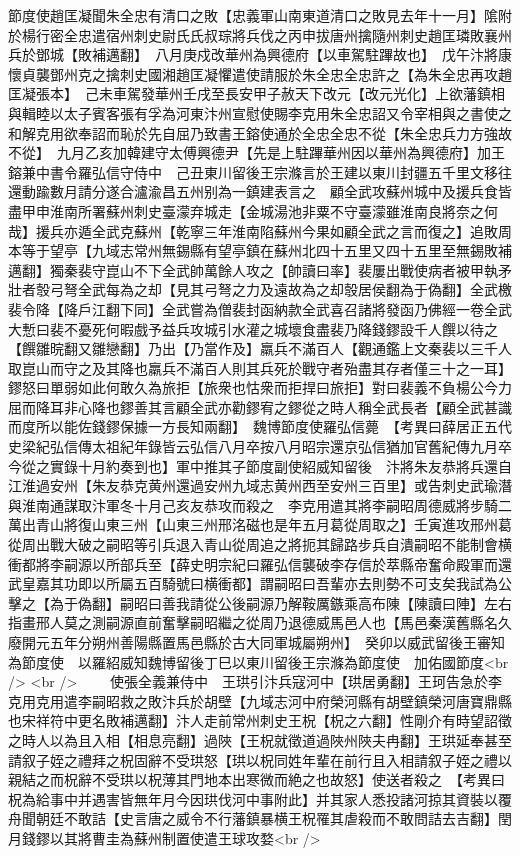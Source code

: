 節度使趙匡凝聞朱全忠有清口之敗【忠義軍山南東道清口之敗見去年十一月】隂附於楊行密全忠遣宿州刺史尉氏氏叔琮將兵伐之丙申拔唐州擒隨州刺史趙匡璘敗襄州兵於鄧城【敗補邁翻】　八月庚戍改華州為興德府【以車駕駐蹕故也】　戊午汴將康懷貞襲鄧州克之擒刺史國湘趙匡凝懼遣使請服於朱全忠全忠許之【為朱全忠再攻趙匡凝張本】　己未車駕發華州壬戌至長安甲子赦天下改元【改元光化】上欲藩鎮相與輯睦以太子賓客張有孚為河東汴州宣慰使賜李克用朱全忠詔又令宰相與之書使之和解克用欲奉詔而恥於先自屈乃致書王鎔使通於全忠全忠不從【朱全忠兵力方強故不從】　九月乙亥加韓建守太傅興德尹【先是上駐蹕華州因以華州為興德府】加王鎔兼中書令羅弘信守侍中　己丑東川留後王宗滌言於王建以東川封疆五千里文移往還動踰數月請分遂合瀘渝昌五州别為一鎮建表言之　顧全武攻蘇州城中及援兵食皆盡甲申淮南所署蘇州刺史臺濛弃城走【金城湯池非粟不守臺濛雖淮南良將奈之何哉】援兵亦遁全武克蘇州【乾寧三年淮南陷蘇州今果如顧全武之言而復之】追敗周本等于望亭【九域志常州無錫縣有望亭鎮在蘇州北四十五里又四十五里至無錫敗補邁翻】獨秦裴守崑山不下全武帥萬餘人攻之【帥讀曰率】裴屢出戰使病者被甲執矛壯者彀弓弩全武每為之却【見其弓弩之力及遠故為之却彀居侯翻為于偽翻】全武檄裴令降【降戶江翻下同】全武嘗為僧裴封函納款全武喜召諸將發函乃佛經一卷全武大慙曰裴不憂死何暇戲予益兵攻城引水灌之城壞食盡裴乃降錢鏐設千人饌以待之【饌雛晥翻又雛戀翻】乃出【乃當作及】羸兵不滿百人【觀通鑑上文秦裴以三千人取崑山而守之及其降也羸兵不滿百人則其兵死於戰守者殆盡其存者僅三十之一耳】鏐怒曰單弱如此何敢久為旅拒【旅衆也怙衆而拒捍曰旅拒】對曰裴義不負楊公今力屈而降耳非心降也鏐善其言顧全武亦勸鏐宥之鏐從之時人稱全武長者【顧全武甚識而度所以能佐錢鏐保據一方長知兩翻】　魏博節度使羅弘信薨　【考異曰薛居正五代史梁紀弘信傳太祖紀年錄皆云弘信八月卒按八月昭宗還京弘信猶加官舊紀傳九月卒今從之實錄十月約奏到也】軍中推其子節度副使紹威知留後　汴將朱友恭將兵還自江淮過安州【朱友恭克黄州還過安州九域志黄州西至安州三百里】或告刺史武瑜潛與淮南通謀取汴軍冬十月己亥友恭攻而殺之　李克用遣其將李嗣昭周德威將步騎二萬出青山將復山東三州【山東三州邢洺磁也是年五月葛從周取之】壬寅進攻邢州葛從周出戰大破之嗣昭等引兵退入青山從周追之將扼其歸路步兵自潰嗣昭不能制會横衝都將李嗣源以所部兵至【薛史明宗紀曰羅弘信襲破李存信於萃縣帝奮命殿軍而還武皇嘉其功即以所屬五百騎號曰横衝都】謂嗣昭曰吾輩亦去則勢不可支矣我試為公擊之【為于偽翻】嗣昭曰善我請從公後嗣源乃解鞍厲鏃乘高布陳【陳讀曰陣】左右指畫邢人莫之測嗣源直前奮擊嗣昭繼之從周乃退德威馬邑人也【馬邑秦漢舊縣名久廢開元五年分朔州善陽縣置馬邑縣於古大同軍城屬朔州】　癸卯以威武留後王審知為節度使　以羅紹威知魏博留後丁巳以東川留後王宗滌為節度使　加佑國節度<br />
<br />
　　使張全義兼侍中　王珙引汴兵寇河中【珙居勇翻】王珂告急於李克用克用遣李嗣昭救之敗汴兵於胡壁【九域志河中府榮河縣有胡壁鎮榮河唐寶鼎縣也宋祥符中更名敗補邁翻】汴人走前常州刺史王柷【柷之六翻】性剛介有時望詔徵之時人以為且入相【相息亮翻】過陜【王柷就徵道過陜州陜夫冉翻】王珙延奉甚至請叙子姪之禮拜之柷固辭不受珙怒【珙以柷同姓年輩在前行且入相請叙子姪之禮以親結之而柷辭不受珙以柷薄其門地本出寒微而絶之也故怒】使送者殺之　【考異曰柷為給事中并遇害皆無年月今因珙伐河中事附此】并其家人悉投諸河掠其資裝以覆舟聞朝廷不敢詰【史言唐之威令不行藩鎮暴横王柷罹其虐殺而不敢問詰去吉翻】閏月錢鏐以其將曹圭為蘇州制置使遣王球攻婺<br />
